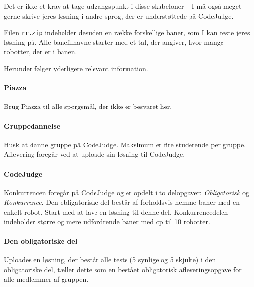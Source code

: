 \documentclass[10pt,a4paper]{article}
\begin{document}
Det er ikke et krav at tage udgangspunkt i disse skabeloner -- I må også meget gerne skrive jeres løsning i andre sprog, der er understøttede på CodeJudge.

Filen \texttt{rr.zip} indeholder desuden en række forskellige baner, som I kan teste jeres løsning på. Alle banefilnavne starter med et tal, der angiver, hvor mange robotter, der er i banen.

Herunder følger yderligere relevant information.



\paragraph{Piazza} Brug Piazza til alle spørgsmål, der ikke er besvaret her.

\paragraph{Gruppedannelse} Husk at danne gruppe på CodeJudge. Maksimum er fire studerende per gruppe. Aflevering foregår ved at uploade sin løsning til CodeJudge.

\paragraph{CodeJudge} Konkurrencen foregår på CodeJudge og er opdelt i to delopgaver: \emph{Obligatorisk} og \emph{Konkurrence}. Den obligatoriske del består af forholdsvis nemme baner med en enkelt robot. Start med at lave en løsning til denne del. Konkurrencedelen indeholder større og mere udfordrende baner med op til 10 robotter.

\paragraph{Den obligatoriske del} Uploades en løsning, der består alle tests (5 synlige og 5 skjulte) i den obligatoriske del, tæller dette som en bestået obligatorisk afleveringsopgave for alle medlemmer af gruppen.
\end{document}

